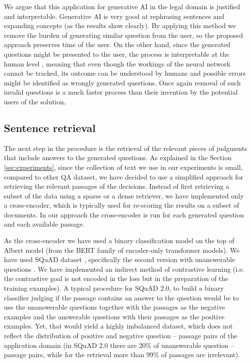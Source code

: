 \documentclass{IOS-Book-Article}
\begin{document}
We argue that this application for generative AI in the legal domain is justified and interpretable. 
Generative AI is very good at rephrasing sentences and expanding concepts (as the results show clearly). 
By applying this method we remove the burden of generating similar question from the user, 
so the proposed approach preserves time of the user. On the other hand, since the generated questions 
might be presented to the user, the process is interpretable at the human level \cite{martinez2023survey}, meaning that
even though the workings of the neural network cannot be tracked, its outcome can be understood by humans and 
possible errors might be identified as wrongly generated questions. Once again removal of such invalid questions 
is a much faster process than their invention by the potential users of the solution.

\subsection{Sentence retrieval}

The next step in the procedure is the retrieval of the relevant pieces of judgments that include answers to the
generated questions. As explained in the Section \ref{sec:experiments}, since the collection of text we use in our experiments
is small, compared to other QA dataset, we have decided to use a simplified approach for retrieving the relevant
passages of the decisions. Instead of first retrieving a subset of the data using a sparse or a dense retriever,
we have implemented only a cross-encoder, which is typically used for re-scoring the results on a subset of documents.
In our approach the cross-encoder is run for each generated question and each available passage. 

As the cross-encoder we have used a binary classification model on the top of Albert \cite{lan2019albert} model (from the BERT family
\cite{devlin2018bert} of encoder-only transformer models). We have used SQuAD dataset \cite{rajpurkar2016squad},
specifically the second version with unanswerable questions \cite{rajpurkar2018know}. We have implemented
an indirect method of contrastive learning (i.e. the contrastive goal is not encoded in the loss but in the preparation of
the  training examples). A typical procedure for SQuAD 2.0, to build a binary classifier judging if the passage 
contains an answer to the question would be to use the unanswerable questions together with the passages as the 
negative examples and the answerable questions with their passages as the positive examples. Yet, that would yield
a highly imbalanced dataset, which does not reflect the distribution of positive and negative question -- passage 
pairs of the application domain (in SQuAD 2.0 there are 20\% of unanswerable question -- passage pairs, while 
for the retrieval more than 99\% of passages are irrelevant). 
\end{document}
